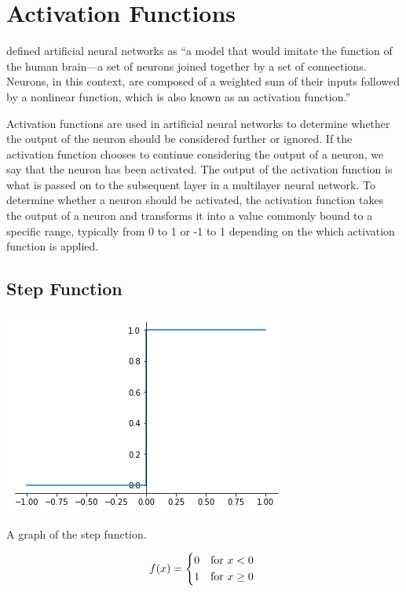 \chapter[Activation Functions]{Activation Functions}
\label{ch:activation-functions}
\citet{caterini2018} defined artificial neural networks as ``a model that would imitate the function of the human brain---a set of neurons joined together by a set of connections. Neurons, in this context, are composed of a weighted sum of their inputs followed by a nonlinear function, which is also known as an activation function.''

Activation functions are used in artificial neural networks to determine whether the output of the neuron should be considered further or ignored. If the activation function chooses to continue considering the output of a neuron, we say that the neuron has been activated. The output of the activation function is what is passed on to the subsequent layer in a multilayer neural network. To determine whether a neuron should be activated, the activation function takes the output of a neuron and transforms it into a value commonly bound to a specific range, typically from 0 to 1 or -1 to 1 depending on the which activation function is applied.

\section{Step Function}\label{sec:step-function}

\begin{marginfigure}
  \includegraphics{graphics/activation_functions/step_function.png}
  \caption{
    A graph of the step function. 
  }
  \label{fig:stepfunction}
\end{marginfigure}

\begin{equation}\label{stepfunction}
    f(x) =
    \begin{dcases*}
        0 & \text{for \(x < 0\)} \\
        1 & \text{for \(x \geq 0\)} \\
    \end{dcases*}
\end{equation}

